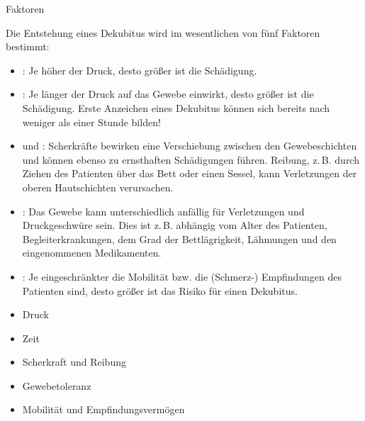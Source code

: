 {Faktoren}
{Die Entstehung eines Dekubitus wird im wesentlichen von fünf
Faktoren bestimmt:


\begin{itemize}
  \item {}: Je höher der Druck, desto größer ist die
  Schädigung.
  \item {}: Je länger der Druck auf das Gewebe
  einwirkt, desto größer ist die Schädigung. Erste
  Anzeichen eines Dekubitus können sich bereits nach
  weniger als einer Stunde bilden!
  \item {} und : Scherkräfte bewirken eine
  Verschiebung zwischen den Gewebeschichten und können
  ebenso zu ernsthaften Schädigungen führen. Reibung, z.\,B.
  durch Ziehen des Patienten über das Bett oder einen Sessel, kann Verletzungen der
  oberen Hautschichten verursachen.
  \item {}: Das Gewebe kann unterschiedlich
  anfällig für Verletzungen und Druckgeschwüre sein. Dies
  ist z.\,B. abhängig vom Alter des Patienten,
  Begleiterkrankungen, dem Grad der Bettlägrigkeit,
  Lähmungen und den eingenommenen Medikamenten.
  \item {}: Je
  eingeschränkter die Mobilität bzw. die (Schmerz-) Empfindungen des Patienten
  sind, desto größer ist das Risiko für einen Dekubitus.
\end{itemize}}
{\begin{itemize}
  \item {Druck}
  \item {Zeit}
  \item {Scherkraft} und {Reibung}
  \item {Gewebetoleranz}
  \item {Mobilität und Empfindungsvermögen}
\end{itemize}}
{}
{}
{}


